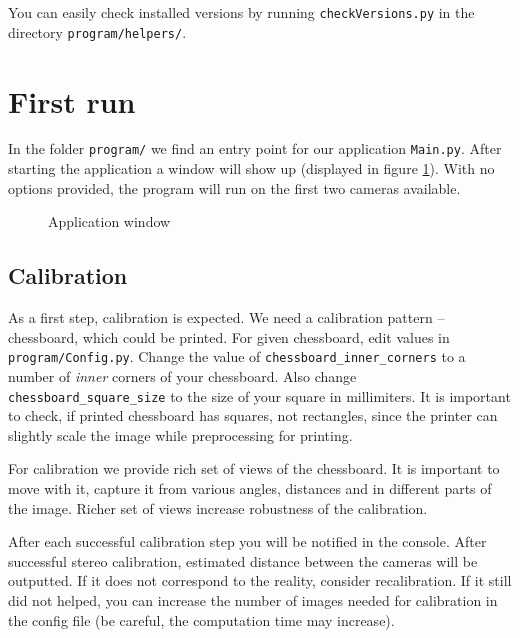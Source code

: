 You can easily check installed versions by running \verb+checkVersions.py+ in
the directory \verb+program/helpers/+.

\section{First run}

In the folder \verb+program/+ we find an entry point for our application
\verb+Main.py+. After starting the application a window will show up (displayed
in figure \ref{fig:application}). With no options provided, the program will
run on the first two cameras available.

\begin{figure}
	\label{fig:application}
	\caption{Application window}
\end{figure}

\subsection{Calibration}
As a first step, calibration is expected. We need a calibration pattern --
chessboard, which could be printed. For given chessboard, edit values in
\verb+program/Config.py+. Change the value of \verb+chessboard_inner_corners+
to a number of \emph{inner} corners of your chessboard. Also change
\verb+chessboard_square_size+ to the size of your square in millimiters. It is
important to check, if printed chessboard has squares, not rectangles, since
the printer can slightly scale the image while preprocessing for printing.

For calibration we provide rich set of views of the chessboard. It is important
to move with it, capture it from various angles, distances and in different
parts of the image. Richer set of views increase robustness of the calibration.

After each successful calibration step you will be notified in the console.
After successful stereo calibration, estimated distance between the cameras
will be outputted. If it does not correspond to the reality, consider
recalibration. If it still did not helped, you can increase the number of
images needed for calibration in the config file (be careful, the computation
time may increase).

